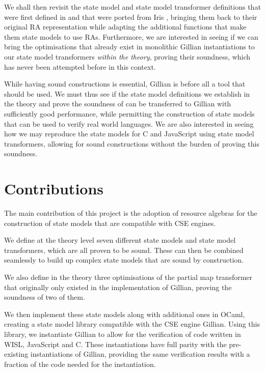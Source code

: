 We shall then revisit the state model and state model transformer definitions that were first defined in \cite{sacha-phd} and that were ported from Iris \cite{iris}, bringing them back to their original RA representation while adapting the additional functions that make them state models to use RAs. Furthermore, we are interested in seeing if we can bring the optimisations that already exist in monolithic Gillian instantiations to our state model transformers \emph{within the theory}, proving their soundness, which has never been attempted before in this context.

While having sound constructions is essential, Gillian is before all a tool that should be used. We must thus see if the state model definitions we establish in the theory and prove the soundness of can be transferred to Gillian with sufficiently good performance, while permitting the construction of state models that can be used to verify real world languages. We are also interested in seeing how we may reproduce the state models for C and JavaScript using state model transformers, allowing for sound constructions without the burden of proving this soundness.

\section{Contributions}

The main contribution of this project is the adoption of resource algebras for the construction of state models that are compatible with CSE engines.

We define at the theory level seven different state models and state model transformers, which are all proven to be sound. These can then be combined seamlessly to build up complex state models that are sound by construction.

We also define in the theory three optimisations of the partial map transformer that originally only existed in the implementation of Gillian, proving the soundness of two of them.

We then implement these state models along with additional ones in OCaml, creating a state model library compatible with the CSE engine Gillian. Using this library, we instantiate Gillian to allow for the verification of code written in WISL, JavaScript and C. These instantiations have full parity with the pre-existing instantiations of Gillian, providing the same verification results with a fraction of the code needed for the instantiation.

